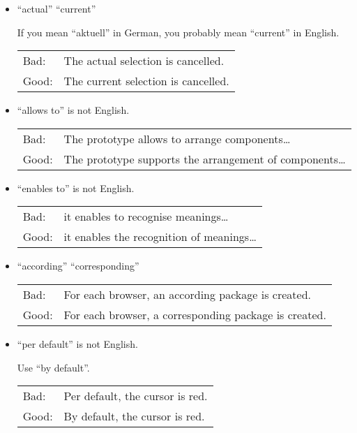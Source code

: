 \begin{itemize}


\item ``actual'' \neqsym ``current'' 

If you mean ``aktuell'' in German, you probably mean
``current'' in English.

\begin{tabular}{lp{0.9\hsize}}
Bad:  & The actual selection is cancelled. \\
Good: & The current selection is cancelled. \\
\end{tabular}



\item ``allows to'' is not English.

\begin{tabular}{lp{0.9\hsize}}
Bad:  & The prototype allows to arrange components\ldots \\
Good: & The prototype supports the arrangement of components\ldots \\
\end{tabular}




\item ``enables to'' is not English.

\begin{tabular}{lp{0.9\hsize}}
Bad:  & it enables to recognise meanings\ldots \\
Good: & it enables the recognition of meanings\ldots \\
\end{tabular}


\item ``according'' \neqsym ``corresponding'' 

\begin{tabular}{lp{0.9\hsize}}
Bad:  & For each browser, an according package is created. \\
Good: & For each browser, a corresponding package is created. \\
\end{tabular}



\item ``per default'' is not English.

Use ``by default''.

\begin{tabular}{lp{0.9\hsize}}
Bad:  & Per default, the cursor is red. \\
Good: & By default, the cursor is red. \\
\end{tabular}





\end{itemize}
